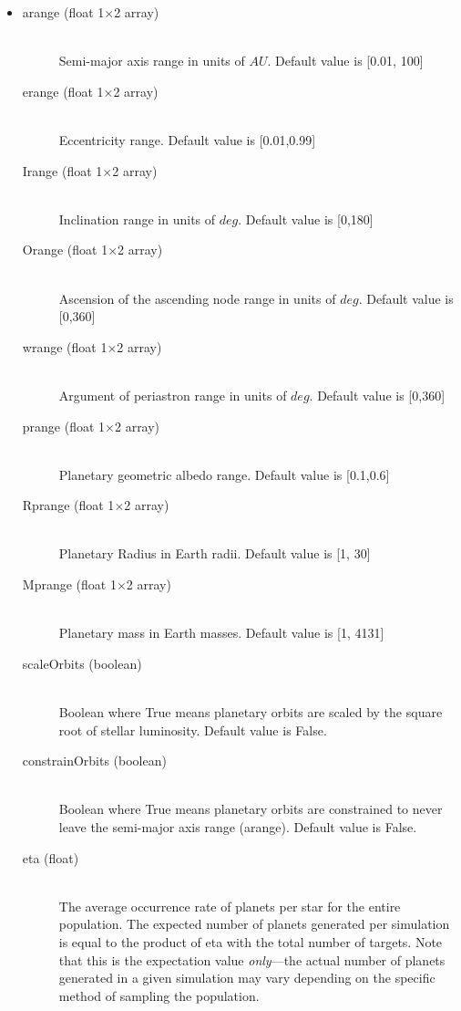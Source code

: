 \documentclass[cleanfoot]{asme2ej}
\begin{document}
\begin{itemize}
\item
\begin{description}
    \item[arange (float 1$\times$2 array)] \hfill \\ Semi-major axis range in units of $ AU $. Default value is [0.01, 100]
    \item[erange (float 1$\times$2 array)] \hfill \\ Eccentricity range.  Default value is [0.01,0.99]
    \item[Irange (float 1$\times$2 array)] \hfill \\ Inclination range in units of $ deg $.  Default value is [0,180]
    \item[Orange (float 1$\times$2 array)] \hfill \\ Ascension of the ascending node range in units of $ deg $.  Default value is [0,360]
    \item[wrange (float 1$\times$2 array)] \hfill \\ Argument of periastron range in units of $ deg $.  Default value is [0,360]
    \item[prange (float 1$\times$2 array)] \hfill \\ Planetary geometric albedo range.  Default value is [0.1,0.6]
    \item[Rprange (float 1$\times$2 array)] \hfill \\ Planetary Radius in Earth radii.  Default value is [1, 30]
    \item[Mprange (float 1$\times$2 array)] \hfill \\ Planetary mass in Earth masses.  Default value is [1, 4131]
    \item [scaleOrbits (boolean)] \hfill \\ Boolean where True means planetary orbits are scaled by the square root of stellar luminosity. Default value is False.
    \item[constrainOrbits (boolean)] \hfill \\ Boolean where True means planetary orbits are constrained to never leave the semi-major axis range (arange). Default value is False.
    \item[eta (float)] \hfill \\ The average occurrence rate of planets per star for the entire population.  The expected number of planets generated per simulation is equal to the product of eta with the total number of targets.  Note that this is the expectation value \emph{only}---the actual number of planets generated in a given simulation may vary depending on the specific method of sampling the population.
\end{description}
\end{itemize}
\end{document}
